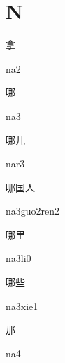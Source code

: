 ﻿%
\section*{N}

\begin{verbete}[na2]{拿}
\begin{pronuncia}{na2}
\end{pronuncia}
\end{verbete}

\begin{verbete}[na3]{哪}
\begin{pronuncia}{na3}
\end{pronuncia}
\end{verbete}

\begin{verbete}[nar3]{哪儿}
\begin{pronuncia}{nar3}
\end{pronuncia}
\end{verbete}

\begin{verbete}{哪国人}
\begin{pronuncia}{na3guo2ren2}
\end{pronuncia}
\end{verbete}

\begin{verbete}[na3li0]{哪里}
\begin{pronuncia}{na3li0}
\end{pronuncia}
\end{verbete}

\begin{verbete}[na3xie1]{哪些}
\begin{pronuncia}{na3xie1}
\end{pronuncia}
\end{verbete}

\begin{verbete}[na4]{那}
\begin{pronuncia}{na4}
\end{pronuncia}
\end{verbete}

